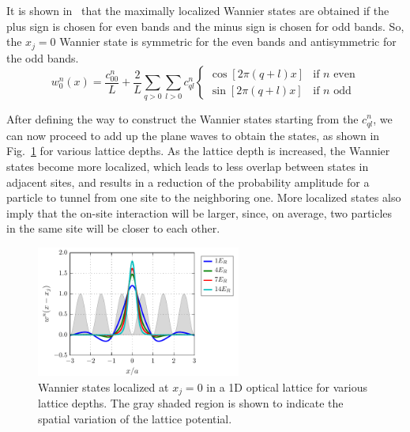 \documentclass[oneside,11pt]{memoir}
\begin{document}
It is shown in~\cite{Kohn1959} that the maximally localized Wannier states are
obtained if the plus sign is chosen for even bands and the minus sign is chosen
for odd bands.  So, the $x_{j}=0$ Wannier state is symmetric for the even bands
and antisymmetric for the odd bands.  
\begin{equation}
  w_{0}^{n}(x)= 
    \frac{c_{00}^{n}}{L}
   + 
    \frac{2}{L}
    \sum_{q>0} 
   \sum_{l > 0 } 
   c_{ql}^{n} 
\begin{cases}
\cos[ 2\pi(q+l)x ] & \text{if $n$ even} \\
\sin[ 2\pi(q+l)x ] & \text{if $n$ odd }
\end{cases}
\end{equation}

After defining the way to construct the Wannier states starting from the
$c_{ql}^{n}$, we can now proceed to add up the plane waves to  obtain the
states, as shown in Fig.~\ref{fig:wannier1d_V0} for various lattice depths.  As
the lattice depth is increased, the Wannier states become more localized, which
leads to less overlap between states in adjacent sites, and results in a
reduction of the probability amplitude for a particle to tunnel from one site
to the neighboring one.   More localized states also imply that the on-site
interaction will be larger, since, on average, two particles in the same site
will be closer to each other.  
\begin{figure}
\centering
\includegraphics[width=0.6\textwidth]{../figures/BandStructure_figures/wannier1d_V0.pdf}
\caption[Wannier states in 1D lattice for various lattice depths.]{\small
Wannier states localized at $x_{j}=0$ in a 1D optical lattice for various
lattice depths.  The gray shaded region is shown to  indicate the spatial
variation of the lattice potential.  } \label{fig:wannier1d_V0}
\end{figure}
\end{document}
